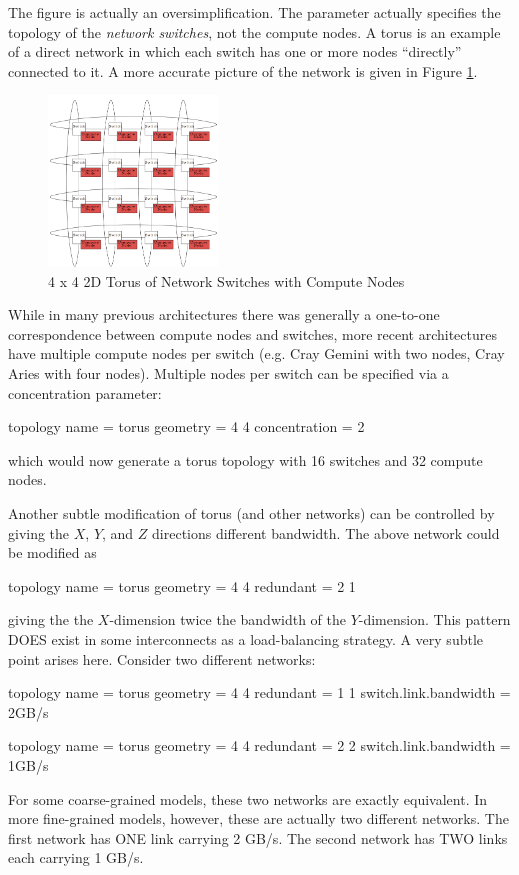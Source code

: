The figure is actually an oversimplification.
The  parameter actually specifies the topology of the \emph{network switches}, not the compute nodes. 
A torus is an example of a direct network in which each switch has one or more nodes ``directly'' connected to it.
A more accurate picture of the network is given in Figure \ref{fig:torus:withnodes}.
\begin{figure}[h]
\centering
\includegraphics[width=0.4\textwidth]{figures/tikz/torus/withnodes.png}
\caption{4 x 4 2D Torus of Network Switches with Compute Nodes}
\label{fig:torus:withnodes}
\end{figure}
While in many previous architectures there was generally a one-to-one correspondence between compute nodes and switches, more recent architectures have multiple compute nodes per switch (e.g. Cray Gemini with two nodes, Cray Aries with four nodes).
Multiple nodes per switch can be specified via a concentration parameter:

\begin{ViFile}
topology {
 name = torus
 geometry = 4 4
 concentration = 2
}
\end{ViFile}
which would now generate a torus topology with 16 switches and 32 compute nodes.

Another subtle modification of torus (and other networks) can be controlled by giving the $X$, $Y$, and $Z$ directions different bandwidth.
The above network could be modified as

\begin{ViFile}
topology {
 name = torus
 geometry = 4 4
 redundant = 2 1
}
\end{ViFile}
giving the the $X$-dimension twice the bandwidth of the $Y$-dimension.
This pattern DOES exist in some interconnects as a load-balancing strategy.
A very subtle point arises here. Consider two different networks:

\begin{ViFile}
topology {
 name = torus
 geometry = 4 4
 redundant = 1 1
}
switch.link.bandwidth = 2GB/s
\end{ViFile}
\begin{ViFile}
topology {
 name = torus
 geometry = 4 4
 redundant = 2 2
}
switch.link.bandwidth = 1GB/s
\end{ViFile}
For some coarse-grained models, these two networks are exactly equivalent.
In more fine-grained models, however, these are actually two different networks.
The first network has ONE link carrying 2 GB/s. The second network has TWO links each carrying 1 GB/s.

